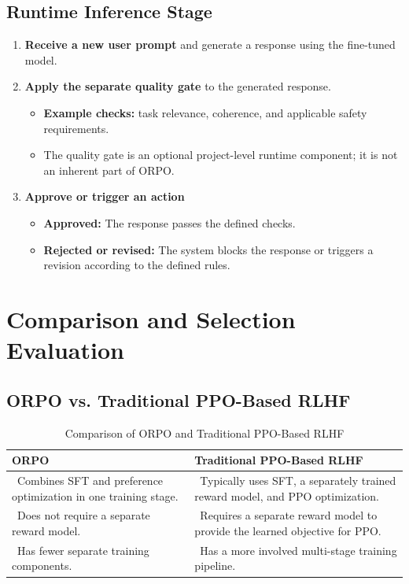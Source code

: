 \documentclass{article}
\newcommand{\cmark}{\ding{51}}%
\newcommand{\xmark}{\ding{55}}%
\begin{document}
\subsection{Runtime Inference Stage}

\begin{enumerate}
    \item \textbf{Receive a new user prompt} and generate a response using the fine-tuned model.
    \item \textbf{Apply the separate quality gate} to the generated response.
    \begin{itemize}
        \item \textbf{Example checks:} task relevance, coherence, and applicable safety requirements.
        \item The quality gate is an optional project-level runtime component; it is not an inherent part of ORPO.
    \end{itemize}
    
    \item \textbf{Approve or trigger an action}
    \begin{itemize}
        \item[\cmark] \textbf{Approved:} The response passes the defined checks.
        \item[\xmark] \textbf{Rejected or revised:} The system blocks the response or triggers a revision according to the defined rules.
    \end{itemize}
\end{enumerate}

\newpage

\section{Comparison and Selection Evaluation}

\subsection{ORPO vs. Traditional PPO-Based RLHF}

\begin{table}[h!]
\centering
\caption{Comparison of ORPO and Traditional PPO-Based RLHF}
\begin{tabularx}{\textwidth}{@{}X X@{}}
\toprule
\textbf{ORPO} & \textbf{Traditional PPO-Based RLHF} \\ \midrule
\cmark\ Combines SFT and preference optimization in one training stage. & \cmark\ Typically uses SFT, a separately trained reward model, and PPO optimization. \\
\cmark\ Does not require a separate reward model. & \cmark\ Requires a separate reward model to provide the learned objective for PPO. \\
\cmark\ Has fewer separate training components. & \cmark\ Has a more involved multi-stage training pipeline. \\
\bottomrule
\end{tabularx}
\end{table}
\end{document}
